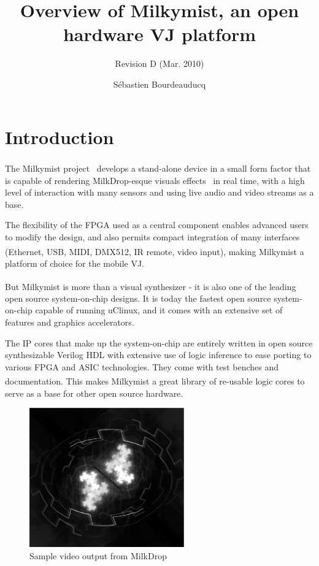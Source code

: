 \documentclass[a4paper,11pt,twocolumn]{paper}
\title{Overview of Milkymist, an open hardware VJ platform}
\subtitle{Revision D (Mar. 2010)}
\author{S\'ebastien Bourdeauducq}
\begin{document}
\maketitle{}
\section{Introduction}
The Milkymist\textsuperscript{\texttrademark} project~\cite{milkymist} develops a stand-alone device in a small form factor that is capable of rendering MilkDrop-esque visuals effects~\cite{milkdrop} in real time, with a high level of interaction with many sensors and using live audio and video streams as a base.

The flexibility of the FPGA used as a central component enables advanced users to modify the design, and also permits compact integration of many interfaces (Ethernet, USB, MIDI, DMX512, IR remote, video input), making Milkymist\textsuperscript{\texttrademark} a platform of choice for the mobile VJ.

But Milkymist\textsuperscript{\texttrademark} is more than a visual synthesizer - it is also one of the leading open source system-on-chip designs. It is today the fastest open source system-on-chip capable of running uClinux, and it comes with an extensive set of features and graphics accelerators.

The IP cores that make up the system-on-chip are entirely written in open source synthesizable Verilog HDL with extensive use of logic inference to ease porting to various FPGA and ASIC technologies. They come with test benches and documentation. This makes Milkymist\textsuperscript{\texttrademark} a great library of re-usable logic cores to serve as a base for other open source hardware.

\begin{figure}
\centering
\includegraphics[height=60mm]{milkdrop_bw.eps}
\caption{Sample video output from MilkDrop}
\label{fig:genodefx}
\end{figure}
\end{document}
